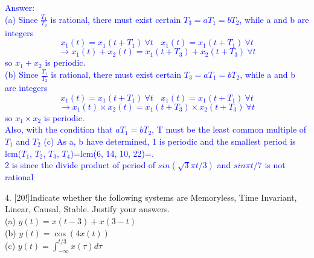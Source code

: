 \documentclass[12pt,a4paper]{article}
\begin{document}
\begin{tcolorbox}
\normalsize
\textcolor{blue}{Answer:\\
(a) Since $\frac{T_1}{T_2}$ is rational, there must exist certain $T_3=aT_1=bT_2$, while a and b are integers
$$x_1(t)=x_1(t+T_1)~ \forall t~~~~x_1(t)=x_1(t+T_1)~\forall t$$
$$\rightarrow x_1(t)+x_2(t)=x_1(t+T_3)+x_2(t+T_3)~\forall t$$
so $x_1+x_2$ is periodic.\\
(b) Since $\frac{T_1}{T_2}$ is rational, there must exist certain $T_3=aT_1=bT_2$, while a and b are integers
$$x_1(t)=x_1(t+T_1)~ \forall t~~~~x_1(t)=x_1(t+T_1)~\forall t$$
$$\rightarrow x_1(t)\times x_2(t)=x_1(t+T_3)\times x_2(t+T_3)~\forall t$$
so $x_1\times x_2$ is periodic.\\
Also, with the condition that $aT_1=bT_2$, T must be the least common multiple of $T_1$ and $T_2$
(c) As a, b have determined, 1 is periodic and the smallest period is lcm($T_1$, $T_2$, $T_3$, $T_4$)=lcm(6, 14, 10, 22)=.\\
2 is  since the divide product of period of $sin(\sqrt{3}\pi t/3)$ and $sin\pi t/7$ is not rational
}
\end{tcolorbox}

\begin{tcolorbox}[colback = white]
4. [20!]Indicate whether the following systems are Memoryless, Time Invariant, Linear, Causal, Stable. Justify your answers.\\
(a) $y(t)=x(t-3)+x(3-t)$\\
(b) $y(t)=\cos{(4x(t))}$\\
(c) $y(t)=\int_{-\infty}^{t/3}x(\tau)d\tau$
\end{tcolorbox}
\end{document}
